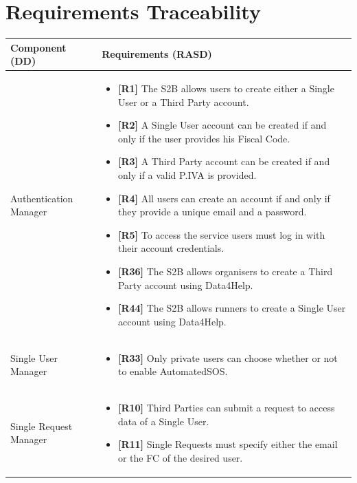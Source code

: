 \documentclass[titlepage]{article}
\begin{document}

\section{Requirements Traceability}

\begin{longtable}{| p{5 cm} | p{8 cm} |} \hline
		Component (DD) & Requirements (RASD)  \\ \hline
		\newline Authentication Manager & 
		\begin{itemize}
			\item {\bf [R1]} The S2B allows users to create either a Single User or a Third Party account. 
			\item {\bf [R2]} A Single User account can be created if and only if the user provides his Fiscal Code. 
			\item {\bf [R3]} A Third Party account can be created if and only if a valid P.IVA is provided. 
			\item {\bf [R4]} All users can create an account if and only if they provide a unique email and a password. 
			\item {\bf [R5]} To access the service users must log in with their account credentials.
			\item {\bf [R36]} The S2B allows organisers to create a Third Party account using Data4Help.
			\item {\bf [R44]} The S2B allows runners to create a Single User account using Data4Help.
		\end{itemize}	\\ \hline
		\newline Single User Manager & 
		\begin{itemize}
			\item {\bf [R33]} Only private users can choose whether or not to enable AutomatedSOS. 
		\end{itemize}		
		\\	 \hline	
		\newline Single Request Manager & 
		\begin{itemize}
			\item {\bf [R10]} Third Parties can submit a request to access data of a Single User. 
			\item {\bf [R11]} Single Requests must specify either the email or the FC of the desired user.

\end{itemize}
\end{longtable}
\end{document}
